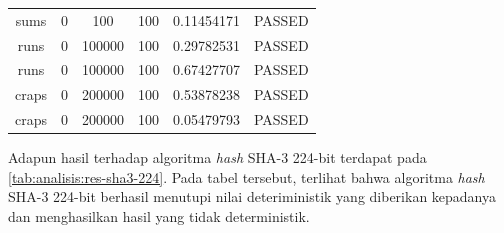 \documentclass[conference]{IEEEtran}
\newcommand{\en}[1]
    {\foreignlanguage{english}{\textit{#1}}}
\begin{document}
\begin{table}[htbp]
\begin{center}
\begin{tabular}{|c|c|c|c|c|c|}
            sums           & 0            & 100          & 100          & 0.11454171            & PASSED         \\
            runs           & 0            & 100000       & 100          & 0.29782531            & PASSED         \\
            runs           & 0            & 100000       & 100          & 0.67427707            & PASSED         \\
            craps          & 0            & 200000       & 100          & 0.53878238            & PASSED         \\
            craps          & 0            & 200000       & 100          & 0.05479793            & PASSED         \\
            \hline
        \end{tabular}
    \end{center}
\end{table}

Adapun hasil  terhadap algoritma \en{hash} SHA-3 224-bit terdapat pada \autoref{tab:analisis:res-sha3-224}.
Pada tabel tersebut, terlihat bahwa algoritma \en{hash} SHA-3 224-bit berhasil menutupi nilai deteriministik yang diberikan kepadanya dan menghasilkan hasil yang tidak deterministik.
\end{document}
